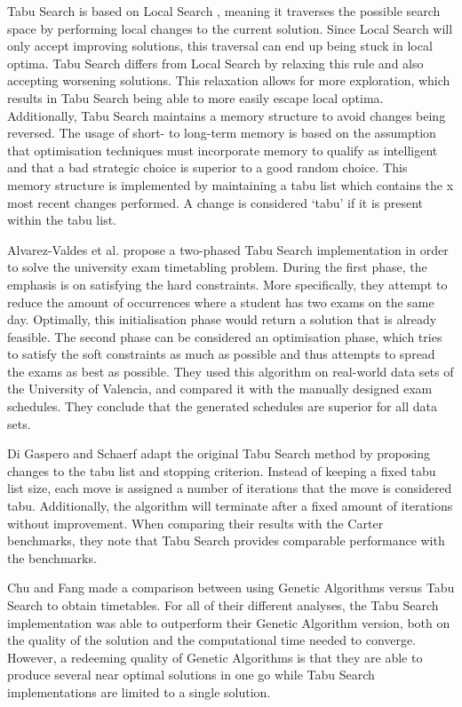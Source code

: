 Tabu Search \cite{glover1993} is based on Local Search \cite{lin1973}, meaning it traverses the possible search space by performing local changes to the current solution. Since Local Search will only accept improving solutions, this traversal can end up being stuck in local optima. Tabu Search differs from Local Search by relaxing this rule and also accepting worsening solutions. This relaxation allows for more exploration, which results in Tabu Search being able to more easily escape local optima. Additionally, Tabu Search maintains a memory structure to avoid changes being reversed. The usage of short- to long-term memory is based on the assumption that optimisation techniques must incorporate memory to qualify as intelligent and that a bad strategic choice is superior to a good random choice\cite{glover1999}. This memory structure is implemented by maintaining a tabu list which contains the x most recent changes performed. A change is considered ‘tabu’ if it is present within the tabu list.

Alvarez-Valdes et al. \cite{alvarez1997} propose a two-phased Tabu Search implementation in order to solve the university exam timetabling problem. During the first phase, the emphasis is on satisfying the hard constraints. More specifically, they attempt to reduce the amount of occurrences where a student has two exams on the same day. Optimally, this initialisation phase would return a solution that is already feasible. The second phase can be considered an optimisation phase, which tries to satisfy the soft constraints as much as possible and thus attempts to spread the exams as best as possible. They used this algorithm on real-world data sets of the University of Valencia, and compared it with the manually designed exam schedules. They conclude that the generated schedules are superior for all data sets.

Di Gaspero and Schaerf \cite{gaspero2001} adapt the original Tabu Search method by proposing changes to the tabu list and stopping criterion. Instead of keeping a fixed tabu list size, each move is assigned a number of iterations that the move is considered tabu. Additionally, the algorithm will terminate after a fixed amount of iterations without improvement. When comparing their results with the Carter benchmarks, they note that Tabu Search provides comparable performance with the benchmarks.

Chu and Fang \cite{Chu2000} made a comparison between using Genetic Algorithms versus Tabu Search to obtain timetables. For all of their different analyses, the Tabu Search implementation was able to outperform their Genetic Algorithm version, both on the quality of the solution and the computational time needed to converge. However, a redeeming quality of Genetic Algorithms is that they are able to produce several near optimal solutions in one go while Tabu Search implementations are limited to a single solution. 


